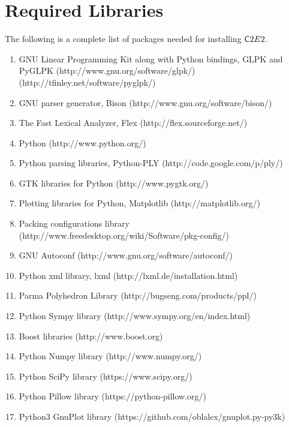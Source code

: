 \documentclass{tufte-book} %
\begin{document}
\chapter{Required Libraries}
\label{app:packs}
The following is a complete list of packages needed for installing ${{\mathsf C2E2}}$. 
\begin{enumerate}
 \item GNU Linear Programming Kit along with Python bindings, GLPK and PyGLPK (http://www.gnu.org/software/glpk/) (http://tfinley.net/software/pyglpk/)
 \item GNU parser generator, Bison (http://www.gnu.org/software/bison/)
 \item The Fast Lexical Analyzer, Flex (http://flex.sourceforge.net/) 
 \item Python (http://www.python.org/)
 \item Python parsing libraries, Python-PLY (http://code.google.com/p/ply/)
 \item GTK libraries for Python (http://www.pygtk.org/)
 \item Plotting libraries for Python, Matplotlib (http://matplotlib.org/)
 \item Packing configurations library  (http://www.freedesktop.org/wiki/Software/pkg-config/)
 \item GNU Autoconf (http://www.gnu.org/software/autoconf/)
 \item Python xml library, lxml (http://lxml.de/installation.html)
 \item Parma Polyhedron Library (http://bugseng.com/products/ppl/)
 \item Python Sympy library (http://www.sympy.org/en/index.html)
 \item Boost libraries (http://www.boost.org)
 \item Python Numpy library (http://www.numpy.org/)
 \item Python SciPy library (https://www.scipy.org/)
 \item Python Pillow library (https://python-pillow.org/)
 \item Python3 GnuPlot library (https://github.com/oblalex/gnuplot.py-py3k)
\end{enumerate}


\backmatter





\printindex %
\end{document}

